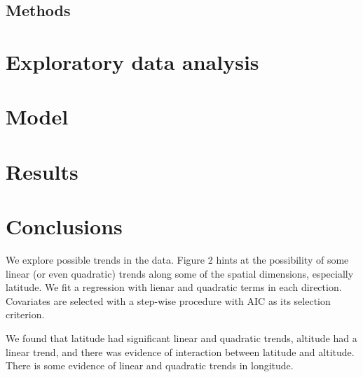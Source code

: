 \documentclass[12pt]{article}
\begin{document}
\subsection{Methods}

\section{Exploratory data analysis}

\section{Model}

\section{Results}

\section{Conclusions}



We explore possible trends in the data. Figure 2 hints at the possibility of some linear (or even quadratic) trends along some of the spatial dimensions, especially latitude. We fit a regression with lienar and quadratic terms in each direction. Covariates are selected with a step-wise procedure with AIC as its selection criterion.
\bigskip

We found that latitude had significant linear and quadratic trends, altitude had a linear trend, and there was evidence of interaction between latitude and altitude. There is some evidence of linear and quadratic trends in longitude.
\end{document}
